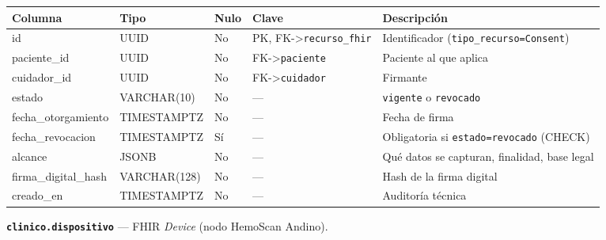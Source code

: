 \documentclass[11pt,a4paper]{article}
\begin{document}
{\small
\begin{longtable}[]{@{}
  >{\raggedright\arraybackslash}p{}
  >{\raggedright\arraybackslash}p{}
  >{\raggedright\arraybackslash}p{}
  >{\raggedright\arraybackslash}p{}
  >{\raggedright\arraybackslash}p{}@{}}
\toprule\noalign{}
\begin{minipage}[b]{\linewidth}\raggedright
Columna
\end{minipage} & \begin{minipage}[b]{\linewidth}\raggedright
Tipo
\end{minipage} & \begin{minipage}[b]{\linewidth}\raggedright
Nulo
\end{minipage} & \begin{minipage}[b]{\linewidth}\raggedright
Clave
\end{minipage} & \begin{minipage}[b]{\linewidth}\raggedright
Descripción
\end{minipage} \\
\midrule\noalign{}
\endhead
\bottomrule\noalign{}
\endlastfoot
id & UUID & No & PK, FK-\textgreater{}\texttt{recurso\_fhir} & Identificador (\texttt{tipo\_recurso=\textquotesingle{}Consent\textquotesingle{}}) \\
paciente\_id & UUID & No & FK-\textgreater{}\texttt{paciente} & Paciente al que aplica \\
cuidador\_id & UUID & No & FK-\textgreater{}\texttt{cuidador} & Firmante \\
estado & VARCHAR(10) & No & --- & \texttt{vigente} o \texttt{revocado} \\
fecha\_otorgamiento & TIMESTAMPTZ & No & --- & Fecha de firma \\
fecha\_revocacion & TIMESTAMPTZ & Sí & --- & Obligatoria si \texttt{estado=\textquotesingle{}revocado\textquotesingle{}} (CHECK) \\
alcance & JSONB & No & --- & Qué datos se capturan, finalidad, base legal \\
firma\_digital\_hash & VARCHAR(128) & No & --- & Hash de la firma digital \\
creado\_en & TIMESTAMPTZ & No & --- & Auditoría técnica \\
\end{longtable}
}

\textbf{\texttt{clinico.dispositivo}} --- FHIR \emph{Device} (nodo HemoScan Andino).
\end{document}
